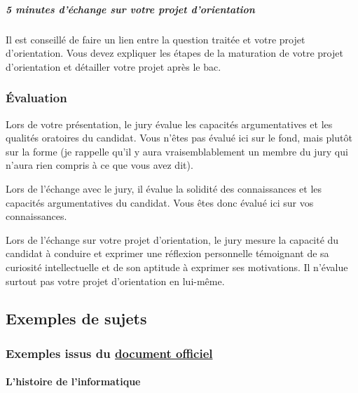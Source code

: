 \documentclass[
  a4paper,
  DIV=11,
  numbers=noendperiod]{scrartcl}
\let\oldparagraph\paragraph
\renewcommand{\paragraph}[1]{\oldparagraph{#1}\mbox{}}
\let\oldsubparagraph\subparagraph
\renewcommand{\subparagraph}[1]{\oldsubparagraph{#1}\mbox{}}
\begin{document}
\hypertarget{minutes-duxe9change-sur-votre-projet-dorientation}{%
\subparagraph{5 minutes d'échange sur votre projet
d'orientation}\label{minutes-duxe9change-sur-votre-projet-dorientation}}

Il est conseillé de faire un lien entre la question traitée et votre
projet d'orientation. Vous devez expliquer les étapes de la maturation
de votre projet d'orientation et détailler votre projet après le bac.

\hypertarget{uxe9valuation}{%
\subsubsection{Évaluation}\label{uxe9valuation}}

Lors de votre présentation, le jury évalue les capacités argumentatives
et les qualités oratoires du candidat. Vous n'êtes pas évalué ici sur le
fond, mais plutôt sur la forme (je rappelle qu'il y aura
vraisemblablement un membre du jury qui n'aura rien compris à ce que
vous avez dit).

Lors de l'échange avec le jury, il évalue la solidité des connaissances
et les capacités argumentatives du candidat. Vous êtes donc évalué ici
sur vos connaissances.

Lors de l'échange sur votre projet d'orientation, le jury mesure la
capacité du candidat à conduire et exprimer une réflexion personnelle
témoignant de sa curiosité intellectuelle et de son aptitude à exprimer
ses motivations. Il n'évalue surtout pas votre projet d'orientation en
lui-même.

\hypertarget{exemples-de-sujets}{%
\subsection{Exemples de sujets}\label{exemples-de-sujets}}

\hypertarget{exemples-issus-du-document-officiel}{%
\subsubsection{\texorpdfstring{Exemples issus du
\href{https://eduscol.education.fr/document/3919/download}{document
officiel}}{Exemples issus du document officiel}}\label{exemples-issus-du-document-officiel}}

\hypertarget{lhistoire-de-linformatique}{%
\paragraph{L'histoire de
l'informatique}\label{lhistoire-de-linformatique}}
\end{document}
